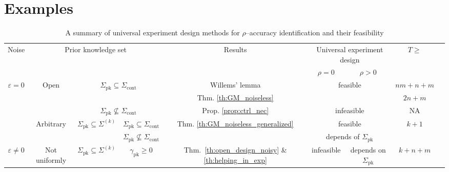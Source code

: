 \documentclass[journal,twoside,web]{ieeecolor}
\begin{document}
%

%

\section{Examples}
\label{sec:ex}

\begin{table}[h]
    \centering
    \caption{A summary of universal experiment design methods for $\rho$--accuracy identification and their feasibility}
    \label{table:summary}
    \begin{tabular}{|c|c|c|c|c|c|c|c|c|c|}
    \hline
     \multirow{2}{*}{Noise} & \multicolumn{4}{c|}{\multirow{2}{*}{Prior knowledge set}} & \multirow{2}{*}{Results} & \multicolumn{2}{c|}{Universal experiment design} & \multirow{2}{*}{$T\geq$} \\ \cline{7-8}
       & \multicolumn{4}{c|}{} & & $\rho=0$ & $\rho>0$ & \\
     \hline\hline
      \multirow{5}{*}{$\varepsilon=0$} & \multirow{3}{*}{Open} & \multicolumn{3}{c|}{\multirow{2}{*}{$\Sigma_\text{pk}\subseteq\Sigma_\text{cont}$}} & Willems' lemma & \multicolumn{2}{c|}{\multirow{2}{*}{feasible}} & $nm+n+m$ \\ \cline{6-6}\cline{9-9}
        &  & \multicolumn{3}{c|}{} & Thm. \ref{th:GM_noiseless} & \multicolumn{2}{c|}{} & $2n+m$ \\ \cline{3-9}
           &   & \multicolumn{3}{c|}{$\Sigma_\text{pk}\not\subseteq\Sigma_\text{cont}$} & Prop. \ref{prop:ctrl_nec} & \multicolumn{2}{c|}{infeasible} & NA \\ \cline{2-9}
           & \multirow{2}{*}{Arbitrary} & \multirow{2}{*}{$\Sigma_\text{pk}\subseteq\Sigma^{(k)}$} & \multicolumn{2}{c|}{$\Sigma_\text{pk}\subseteq\Sigma_\text{cont}$} & \multirow{2}{*}{Thm. \ref{th:GM_noiseless_generalized}} & \multicolumn{2}{c|}{feasible} & \multirow{2}{*}{$k+1$} \\ \cline{4-5} \cline{7-8}
           & & & \multicolumn{2}{c|}{$\Sigma_\text{pk}\not\subseteq\Sigma_\text{cont}$} &  & \multicolumn{2}{c|}{depends of $\Sigma_\text{pk}$} & \\ \hline\hline
           \multirow{4}{*}{$\varepsilon\neq 0$} & Not uniformly & \multirow{4}{*}{$\Sigma_\text{pk}\subseteq\Sigma^{(k)}$} & \multicolumn{2}{c|}{$\gamma_\text{pk}\geq0$} & Thm.~\ref{th:open_design_noisy} \& \ref{th:helping_in_exp} & \multirow{2}{*}{infeasible} & depends on $\Sigma_\text{pk}$ & \multirow{2}{*}{$k+n+m$} \\ \cline{5-6}\cline{8-8}

\end{tabular}
\end{table}
\end{document}
